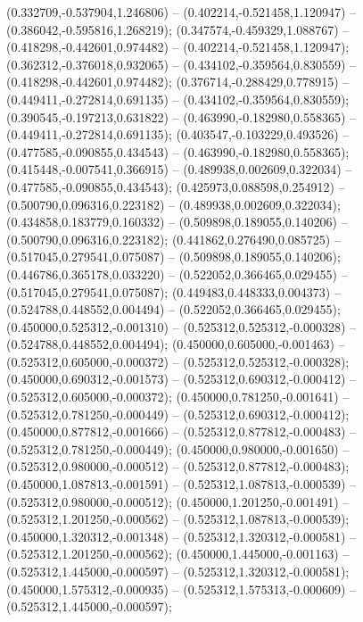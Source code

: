  (0.332709,-0.537904,1.246806) -- (0.402214,-0.521458,1.120947) -- (0.386042,-0.595816,1.268219);
 (0.347574,-0.459329,1.088767) -- (0.418298,-0.442601,0.974482) -- (0.402214,-0.521458,1.120947);
 (0.362312,-0.376018,0.932065) -- (0.434102,-0.359564,0.830559) -- (0.418298,-0.442601,0.974482);
 (0.376714,-0.288429,0.778915) -- (0.449411,-0.272814,0.691135) -- (0.434102,-0.359564,0.830559);
 (0.390545,-0.197213,0.631822) -- (0.463990,-0.182980,0.558365) -- (0.449411,-0.272814,0.691135);
 (0.403547,-0.103229,0.493526) -- (0.477585,-0.090855,0.434543) -- (0.463990,-0.182980,0.558365);
 (0.415448,-0.007541,0.366915) -- (0.489938,0.002609,0.322034) -- (0.477585,-0.090855,0.434543);
 (0.425973,0.088598,0.254912) -- (0.500790,0.096316,0.223182) -- (0.489938,0.002609,0.322034);
 (0.434858,0.183779,0.160332) -- (0.509898,0.189055,0.140206) -- (0.500790,0.096316,0.223182);
 (0.441862,0.276490,0.085725) -- (0.517045,0.279541,0.075087) -- (0.509898,0.189055,0.140206);
 (0.446786,0.365178,0.033220) -- (0.522052,0.366465,0.029455) -- (0.517045,0.279541,0.075087);
 (0.449483,0.448333,0.004373) -- (0.524788,0.448552,0.004494) -- (0.522052,0.366465,0.029455);
 (0.450000,0.525312,-0.001310) -- (0.525312,0.525312,-0.000328) -- (0.524788,0.448552,0.004494);
 (0.450000,0.605000,-0.001463) -- (0.525312,0.605000,-0.000372) -- (0.525312,0.525312,-0.000328);
 (0.450000,0.690312,-0.001573) -- (0.525312,0.690312,-0.000412) -- (0.525312,0.605000,-0.000372);
 (0.450000,0.781250,-0.001641) -- (0.525312,0.781250,-0.000449) -- (0.525312,0.690312,-0.000412);
 (0.450000,0.877812,-0.001666) -- (0.525312,0.877812,-0.000483) -- (0.525312,0.781250,-0.000449);
 (0.450000,0.980000,-0.001650) -- (0.525312,0.980000,-0.000512) -- (0.525312,0.877812,-0.000483);
 (0.450000,1.087813,-0.001591) -- (0.525312,1.087813,-0.000539) -- (0.525312,0.980000,-0.000512);
 (0.450000,1.201250,-0.001491) -- (0.525312,1.201250,-0.000562) -- (0.525312,1.087813,-0.000539);
 (0.450000,1.320312,-0.001348) -- (0.525312,1.320312,-0.000581) -- (0.525312,1.201250,-0.000562);
 (0.450000,1.445000,-0.001163) -- (0.525312,1.445000,-0.000597) -- (0.525312,1.320312,-0.000581);
 (0.450000,1.575312,-0.000935) -- (0.525312,1.575313,-0.000609) -- (0.525312,1.445000,-0.000597);

